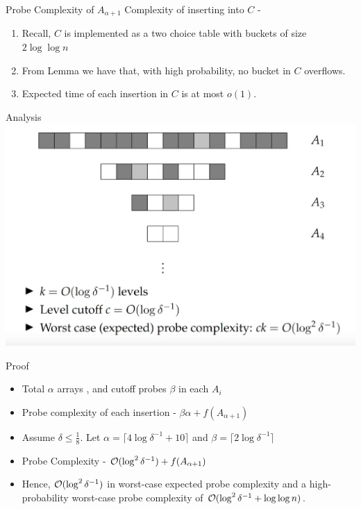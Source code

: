 \documentclass{beamer}
\begin{document}
\begin{frame}{Probe Complexity of $A_{\alpha + 1}$}
	Complexity of inserting into $C$ - 
	\begin{enumerate}
		\item Recall, $C$ is implemented as a two choice table with buckets of size $2\log{\log{n}}$
		\item From Lemma we have that, with high probability, no bucket in $C$ overflows. 
		\item Expected time of each insertion in $C$ is at most $o(1)$.
	\end{enumerate}
\end{frame}

\begin{frame}{Analysis}
	\includegraphics[scale=0.3]{analysis}
\end{frame}

\begin{frame}{Proof}
	\begin{itemize}
		\item Total $\alpha$ arrays , and cutoff probes $\beta$ in each $A_i$ 
		\item Probe complexity of each insertion - $\beta\alpha + f(A_{\alpha + 1})$ 
		\item Assume $\delta \le \frac{1}{8}$. Let $\alpha = \lceil 4\log{\delta^{-1} + 10} \rceil$ and $\beta = \lceil 2\log{\delta^{-1}}\rceil$
		\item Probe Complexity - ${\cal O}(\log^2{\delta^{-1}}) + f(A_{\alpha+1})$ 
		\item  Hence, ${\cal O}(\log^2{\delta^{-1}})$ in worst-case expected probe  complexity and a high-probability worst-case probe complexity of ${\cal O}(\log^2{\delta^{-1}} + \log{\log{n}})$.
	\end{itemize}
\end{frame}
\end{document}
